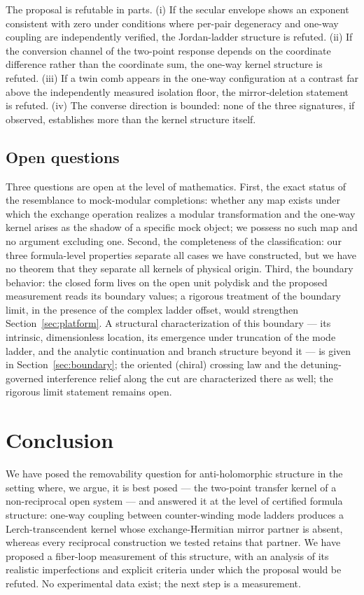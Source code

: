 \documentclass[11pt,a4paper]{article}
\begin{document}
The proposal is refutable in parts. (i) If the secular envelope shows an
exponent consistent with zero under conditions where per-pair degeneracy and
one-way coupling are independently verified, the Jordan-ladder structure is
refuted. (ii) If the conversion channel of the two-point response depends on
the coordinate difference rather than the coordinate sum, the one-way kernel
structure is refuted. (iii) If a twin comb appears in the one-way configuration
at a contrast far above the independently measured isolation floor, the
mirror-deletion statement is refuted. (iv) The converse direction is bounded:
none of the three signatures, if observed, establishes more than the kernel
structure itself.

\subsection{Open questions}

Three questions are open at the level of mathematics. First, the exact status
of the resemblance to mock-modular completions: whether any map exists under
which the exchange operation realizes a modular transformation and the one-way
kernel arises as the shadow of a specific mock object; we possess no such map
and no argument excluding one. Second, the completeness of the classification:
our three formula-level properties separate all cases we have constructed, but
we have no theorem that they separate all kernels of physical origin. Third,
the boundary behavior: the closed form lives on the open unit polydisk and the
proposed measurement reads its boundary values; a rigorous treatment of the
boundary limit, in the presence of the complex ladder offset, would strengthen
Section~\ref{sec:platform}. A structural characterization of this boundary --- its intrinsic, dimensionless location, its emergence under truncation of the mode ladder, and the analytic continuation and branch structure beyond it --- is given in Section~\ref{sec:boundary}; the oriented (chiral) crossing law and the detuning-governed interference relief along the cut are characterized there as well; the rigorous limit statement remains open.

\section{Conclusion}

We have posed the removability question for anti-holomorphic structure in the
setting where, we argue, it is best posed --- the two-point transfer kernel of
a non-reciprocal open system --- and answered it at the level of certified
formula structure: one-way coupling between counter-winding mode ladders
produces a Lerch-transcendent kernel whose exchange-Hermitian mirror partner is
absent, whereas every reciprocal construction we tested retains that partner.
We have proposed a fiber-loop measurement of this structure, with an analysis
of its realistic imperfections and explicit criteria under which the proposal
would be refuted. No experimental data exist; the next step is a measurement.
\end{document}

